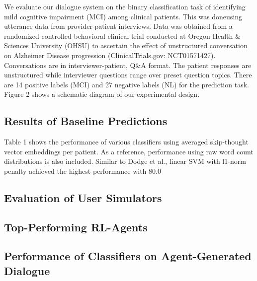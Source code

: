 
We evaluate our dialogue system on the binary classification task of identifying mild cognitive impairment (MCI) 
among clinical patients. This was doneusing utterance data from provider-patient interviews.
Data was obtained from a randomized controlled behavioral clinical trial conducted at Oregon Health & Sciences University (OHSU) 
to ascertain the effect of unstructured conversation on Alzheimer Disease progression (ClinicalTrials.gov: NCT01571427). 
Conversations are in interviewer-patient, Q&A format. 
The patient responses are unstructured while interviewer questions range over preset question topics. 
There are 14 positive labels (MCI) and 27 negative labels (NL) for the prediction task. 
Figure 2 shows a schematic diagram of our experimental design.


\subsection { Results of Baseline Predictions }
Table 1 shows the performance of various classifiers using averaged skip-thought vector embeddings per patient. 
As a reference, performance using raw word count distributions is also included. 
Similar to Dodge et al., linear SVM with l1-norm penalty achieved the highest performance with 
80.0%


\subsection { Evaluation of User Simulators }
\subsection { Top-Performing RL-Agents }
\subsection { Performance of Classifiers on Agent-Generated Dialogue}


